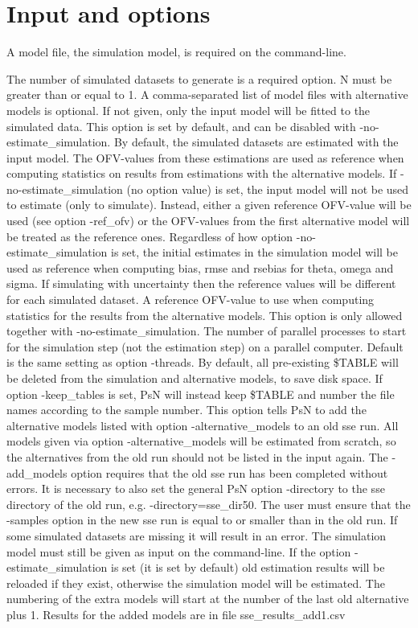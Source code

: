 \section{Input and options}
A model file, the simulation model, is required on the command-line.
\begin{optionlist}
The number of simulated datasets to generate is a required option. N must be greater than or equal to 1. 
\nextopt
{}
A comma-separated list of model files with alternative models is optional. If not given, only the input model will be fitted to the simulated data. 
\nextopt
{}
This option is set by default, and can be disabled with -no-estimate\_simulation. By default, the simulated datasets are estimated with the input model. The OFV-values from these estimations are used as reference when computing statistics on results from estimations with the alternative models. If -no-estimate\_simulation (no option value) is set, the input model will not be used to estimate (only to simulate). Instead, either a given reference OFV-value will be used (see option -ref\_ofv) or the OFV-values from the first alternative model will be treated as the reference ones. Regardless of how option -no-estimate\_simulation is set, the initial estimates in the simulation model will be used as reference when computing bias, rmse and rsebias for theta, omega and sigma. If simulating with uncertainty then the reference values will be different for each simulated dataset. 
\nextopt
{}
A reference OFV-value to use when computing statistics for the results from the alternative models. This option is only allowed together with -no-estimate\_simulation. 
\nextopt
{}
The number of parallel processes to start for the simulation step (not the estimation step) on a parallel computer. Default is the same setting as option -threads. 
\nextopt
{}
By default, all pre-existing \$TABLE will be deleted from the simulation and alternative models, to save disk space. If option -keep\_tables is set, 
PsN will instead keep \$TABLE and number the file names according to the sample number.
\nextopt
{}
This option tells PsN to add the alternative models listed with option -alternative\_models to an old sse run. All models given via option -alternative\_models will be estimated from scratch, so the alternatives from the old run should not be listed in the input again. The -add\_models option requires that the old sse run has been completed without errors. It is necessary to also set the general PsN option -directory to the sse directory of the old run,       e.g. -directory=sse\_dir50. The user must ensure that the -samples option in the new sse run is equal to or smaller than in the old run. If some simulated datasets are missing it will result in an error.       The simulation model must still be given as input on the command-line. If the option -estimate\_simulation is set (it is set by default) old estimation results will be reloaded if they exist, otherwise the simulation model will be estimated. The numbering of the extra models will start at the number of the last old alternative plus 1. Results for the added models are in file sse\_results\_add1.csv 

\end{optionlist}
